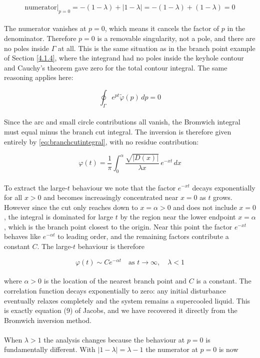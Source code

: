 \begin{equation}
    \text{numerator}\big|_{p=0} = -(1-\lambda) + |1-\lambda| = 
    -(1-\lambda) + (1-\lambda) = 0
\end{equation}
\\
The numerator vanishes at $p = 0$, which means it cancels the factor of $p$ in 
the denominator. Therefore $p = 0$ is a removable singularity, not a 
pole, and there are no poles inside $\Gamma$ at all. This is the same situation 
as in the branch point example of Section \ref{4.1.4}, where the integrand had no poles 
inside the keyhole contour and Cauchy's theorem gave zero for the total contour 
integral. The same reasoning applies here:

\begin{equation}
    \oint_\Gamma e^{pt}\tilde{\varphi}(p)\, dp = 0
\end{equation}
\\
Since the arc and small circle contributions all vanish, the Bromwich integral 
must equal minus the branch cut integral. The inversion is therefore given 
entirely by \eqref{eq:branchcutintegral}, with no residue contribution:

\begin{equation}
    \varphi(t) = \frac{1}{\pi}\int_0^{\alpha} 
    \frac{\sqrt{|D(x)|}}{\lambda x}\, e^{-xt}\, dx
\end{equation}
\\
To extract the large-$t$ behaviour we note that the factor $e^{-xt}$ decays 
exponentially for all $x > 0$ and becomes increasingly concentrated near $x = 0$ 
as $t$ grows. However since the cut only reaches down to $x = \alpha > 0$ and 
does not include $x = 0$, the integral is dominated for large $t$ by the region 
near the lower endpoint $x = \alpha$, which is the branch point closest to the 
origin. Near this point the factor $e^{-xt}$ behaves like $e^{-\alpha t}$ to 
leading order, and the remaining factors contribute a constant $C$. The 
large-$t$ behaviour is therefore

\begin{equation}
    \boxed{\varphi(t) \sim Ce^{-\alpha t} \quad \text{as } t \to \infty, 
    \quad \lambda < 1}
    \label{eq:liquidphase}
\end{equation}
\\
where $\alpha > 0$ is the location of the nearest branch point and $C$ is a 
constant. The correlation function decays exponentially to zero: any initial 
disturbance eventually relaxes completely and the system remains a 
supercooled liquid. This is exactly equation (9) of Jacobs, and we 
have recovered it directly from the Bromwich inversion method.
\\
\\
When $\lambda > 1$ the analysis changes because the behaviour at $p = 0$ is 
fundamentally different. With $|1-\lambda| = \lambda - 1$ the numerator at 
$p = 0$ is now

